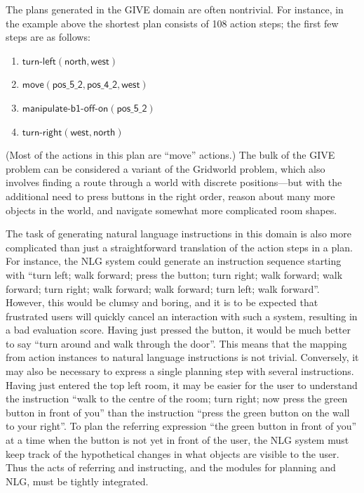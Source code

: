 The plans generated in the GIVE domain are often nontrivial. For instance,
in the example above the shortest plan consists of 108 action steps; the
first few steps are as follows:
%
\begin{enumerate}
\item $\mathsf{turn}\textsf{-}\mathsf{left}(\mathsf{north}, \mathsf{west})$
\item $\mathsf{move}(\mathsf{pos\_5\_2}, \mathsf{pos\_4\_2}, \mathsf{west})$
\item $\mathsf{manipulate}\textsf{-}\mathsf{b1}\textsf{-}\mathsf{off}\textsf{-}\mathsf{on}(\mathsf{pos\_5\_2})$
\item $\mathsf{turn}\textsf{-}\mathsf{right}(\mathsf{west}, \mathsf{north})$
\end{enumerate}
%
(Most of the actions in this plan are ``move'' actions.) The bulk of the
GIVE problem can be considered a variant of the Gridworld problem, which
also involves finding a route through a world with discrete positions---but
with the additional need to press buttons in the right order, reason about
many more objects in the world, and navigate somewhat more complicated room
shapes.

The task of generating natural language instructions in this domain is also
more complicated than just a straightforward translation of the action
steps in a plan. For instance, the NLG system could generate an instruction
sequence starting with ``turn left; walk forward; press the button; turn
right; walk forward; walk forward; turn right; walk forward; walk forward;
turn left; walk forward''.  However, this would be clumsy and boring, and
it is to be expected that frustrated users will quickly cancel an
interaction with such a system, resulting in a bad evaluation score.
Having just pressed the button, it would be much better to say ``turn
around and walk through the door''.  This means that the mapping from
action instances to natural language instructions is not trivial.
Conversely, it may also be necessary to express a single planning step with
several instructions.  Having just entered the top left room, it may be
easier for the user to understand the instruction ``walk to the centre of
the room; turn right; now press the green button in front of you'' than the
instruction ``press the green button on the wall to your right''.  To plan
the referring expression ``the green button in front of you'' at a time
when the button is not yet in front of the user, the NLG system must keep
track of the hypothetical changes in what objects are visible to the user.
Thus the acts of referring and instructing, and the modules for planning
and NLG, must be tightly integrated.

